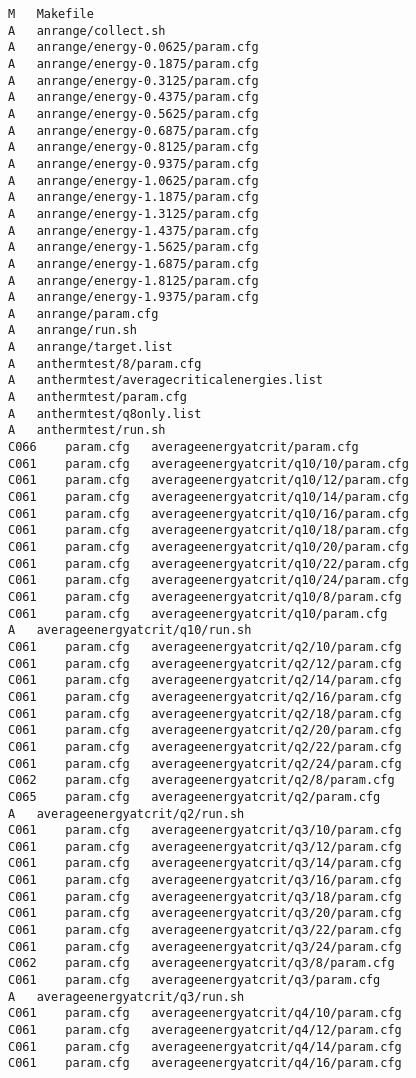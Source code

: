 \documentclass[12pt,a4paper,notitlepage,twoside]{memoir}
\begin{document}
\begin{lstlisting}[breaklines]
M	Makefile
A	anrange/collect.sh
A	anrange/energy-0.0625/param.cfg
A	anrange/energy-0.1875/param.cfg
A	anrange/energy-0.3125/param.cfg
A	anrange/energy-0.4375/param.cfg
A	anrange/energy-0.5625/param.cfg
A	anrange/energy-0.6875/param.cfg
A	anrange/energy-0.8125/param.cfg
A	anrange/energy-0.9375/param.cfg
A	anrange/energy-1.0625/param.cfg
A	anrange/energy-1.1875/param.cfg
A	anrange/energy-1.3125/param.cfg
A	anrange/energy-1.4375/param.cfg
A	anrange/energy-1.5625/param.cfg
A	anrange/energy-1.6875/param.cfg
A	anrange/energy-1.8125/param.cfg
A	anrange/energy-1.9375/param.cfg
A	anrange/param.cfg
A	anrange/run.sh
A	anrange/target.list
A	anthermtest/8/param.cfg
A	anthermtest/averagecriticalenergies.list
A	anthermtest/param.cfg
A	anthermtest/q8only.list
A	anthermtest/run.sh
C066	param.cfg	averageenergyatcrit/param.cfg
C061	param.cfg	averageenergyatcrit/q10/10/param.cfg
C061	param.cfg	averageenergyatcrit/q10/12/param.cfg
C061	param.cfg	averageenergyatcrit/q10/14/param.cfg
C061	param.cfg	averageenergyatcrit/q10/16/param.cfg
C061	param.cfg	averageenergyatcrit/q10/18/param.cfg
C061	param.cfg	averageenergyatcrit/q10/20/param.cfg
C061	param.cfg	averageenergyatcrit/q10/22/param.cfg
C061	param.cfg	averageenergyatcrit/q10/24/param.cfg
C061	param.cfg	averageenergyatcrit/q10/8/param.cfg
C061	param.cfg	averageenergyatcrit/q10/param.cfg
A	averageenergyatcrit/q10/run.sh
C061	param.cfg	averageenergyatcrit/q2/10/param.cfg
C061	param.cfg	averageenergyatcrit/q2/12/param.cfg
C061	param.cfg	averageenergyatcrit/q2/14/param.cfg
C061	param.cfg	averageenergyatcrit/q2/16/param.cfg
C061	param.cfg	averageenergyatcrit/q2/18/param.cfg
C061	param.cfg	averageenergyatcrit/q2/20/param.cfg
C061	param.cfg	averageenergyatcrit/q2/22/param.cfg
C061	param.cfg	averageenergyatcrit/q2/24/param.cfg
C062	param.cfg	averageenergyatcrit/q2/8/param.cfg
C065	param.cfg	averageenergyatcrit/q2/param.cfg
A	averageenergyatcrit/q2/run.sh
C061	param.cfg	averageenergyatcrit/q3/10/param.cfg
C061	param.cfg	averageenergyatcrit/q3/12/param.cfg
C061	param.cfg	averageenergyatcrit/q3/14/param.cfg
C061	param.cfg	averageenergyatcrit/q3/16/param.cfg
C061	param.cfg	averageenergyatcrit/q3/18/param.cfg
C061	param.cfg	averageenergyatcrit/q3/20/param.cfg
C061	param.cfg	averageenergyatcrit/q3/22/param.cfg
C061	param.cfg	averageenergyatcrit/q3/24/param.cfg
C062	param.cfg	averageenergyatcrit/q3/8/param.cfg
C061	param.cfg	averageenergyatcrit/q3/param.cfg
A	averageenergyatcrit/q3/run.sh
C061	param.cfg	averageenergyatcrit/q4/10/param.cfg
C061	param.cfg	averageenergyatcrit/q4/12/param.cfg
C061	param.cfg	averageenergyatcrit/q4/14/param.cfg
C061	param.cfg	averageenergyatcrit/q4/16/param.cfg

\end{lstlisting}
\end{document}
